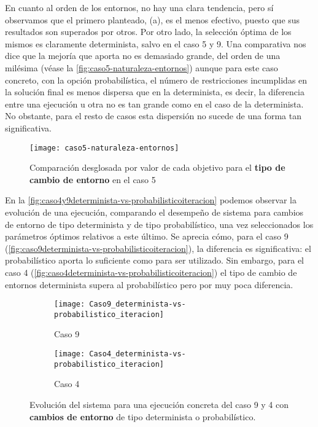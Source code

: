 En cuanto al orden de los entornos, no hay una clara tendencia, pero sí observamos que el primero planteado, (a), es el menos efectivo, puesto que sus resultados son superados por otros. Por otro lado, la selección óptima de los mismos es claramente determinista, salvo en el caso 5 y 9. 
Una comparativa nos dice que la mejoría que aporta no es demasiado grande, del orden de una milésima (véase la \autoref{fig:caso5-naturaleza-entornos}) aunque para este caso concreto, con la opción probabilística, el número de restricciones incumplidas en la solución final es menos dispersa que en la determinista, es decir, la diferencia entre una ejecución u otra no es tan grande como en el caso de la determinista. No obstante, para el resto de casos esta dispersión no sucede de una forma tan significativa.

\begin{figure}
	\centering
	\texttt{[image: caso5-naturaleza-entornos]}
	\caption{Comparación desglosada por valor de cada objetivo para el \textbf{tipo de cambio de entorno} en el caso 5}
	\label{fig:caso5-naturaleza-entornos}
\end{figure}

En la \autoref{fig:caso4y9determinista-vs-probabilisticoiteracion} podemos observar la evolución de una ejecución, comparando el desempeño de sistema para cambios de entorno de tipo determinista y de tipo probabilístico, una vez seleccionados los parámetros óptimos relativos a este último. Se aprecia cómo, para el caso 9  (\autoref{fig:caso9determinista-vs-probabilisticoiteracion}), la diferencia es significativa: el probabilístico aporta lo suficiente como para ser utilizado. Sin embargo, para el caso 4 (\autoref{fig:caso4determinista-vs-probabilisticoiteracion}) el tipo de cambio de entornos determinista supera al probabilístico pero por muy poca diferencia.

\begin{figure}
	\begin{subfigure}{\linewidth}
		\centering
		\texttt{[image: Caso9\_determinista-vs-probabilistico\_iteracion]}
		\caption{Caso 9}
		\label{fig:caso9determinista-vs-probabilisticoiteracion}
	\end{subfigure}

	\begin{subfigure}{\linewidth}
		\centering
		\texttt{[image: Caso4\_determinista-vs-probabilistico\_iteracion]}
		\caption{Caso 4}
		\label{fig:caso4determinista-vs-probabilisticoiteracion}
	\end{subfigure}
	\caption{Evolución del sistema para una ejecución concreta del caso 9 y 4 con \textbf{cambios de entorno} de tipo determinista o probabilístico.}
	\label{fig:caso4y9determinista-vs-probabilisticoiteracion}
\end{figure}



